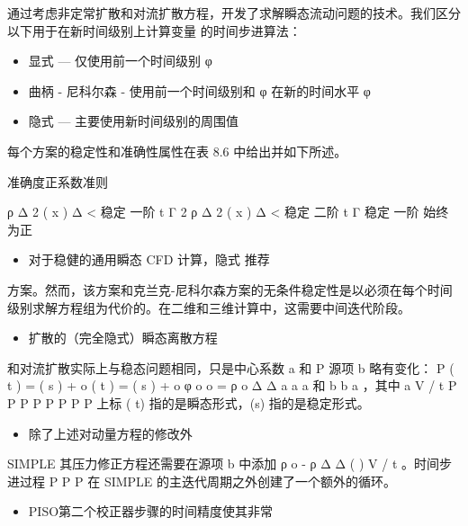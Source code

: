 \documentclass[11pt,a4paper,openany,fontset=none]{ctexbook}
\begin{document}
通过考虑非定常扩散和对流扩散方程，开发了求解瞬态流动问题的技术。我们区分以下用于在新时间级别上计算变量 的时间步进算法：

\begin{itemize}

\item 显式 — 仅使用前一个时间级别 φ

\item 曲柄 - 尼科尔森 - 使用前一个时间级别和 φ 在新的时间水平 φ

\item 隐式 — 主要使用新时间级别的周围值

\end{itemize}

每个方案的稳定性和准确性属性在表 8.6 中给出并如下所述。

准确度正系数准则

ρ Δ 2 ( x ) Δ < 稳定 一阶 t Γ 2 ρ Δ 2 ( x ) Δ < 稳定 二阶 t Γ
稳定 一阶 始终为正

\begin{itemize}

\item 对于稳健的通用瞬态 CFD 计算，隐式
推荐

\end{itemize}

方案。然而，该方案和克兰克-尼科尔森方案的无条件稳定性是以必须在每个时间级别求解方程组为代价的。在二维和三维计算中，这需要中间迭代阶段。

\begin{itemize}

\item 扩散的（完全隐式）瞬态离散方程

\end{itemize}

和对流扩散实际上与稳态问题相同，只是中心系数 a 和 P 源项 b 略有变化： P ( t ) = ( s ) + o ( t ) = ( s ) + o φ o o = ρ o Δ Δ a a a 和 b b a ，其中 a V / t P P P P P P P P 上标 ( t) 指的是瞬态形式，(s) 指的是稳定形式。

\begin{itemize}

\item 除了上述对动量方程的修改外

\end{itemize}

SIMPLE 其压力修正方程还需要在源项 b 中添加 ρ o - ρ Δ Δ ( ) V / t 。时间步进过程 P P P 在 SIMPLE 的主迭代周期之外创建了一个额外的循环。

\begin{itemize}

\item PISO第二个校正器步骤的时间精度使其非常

\end{itemize}
\end{document}
